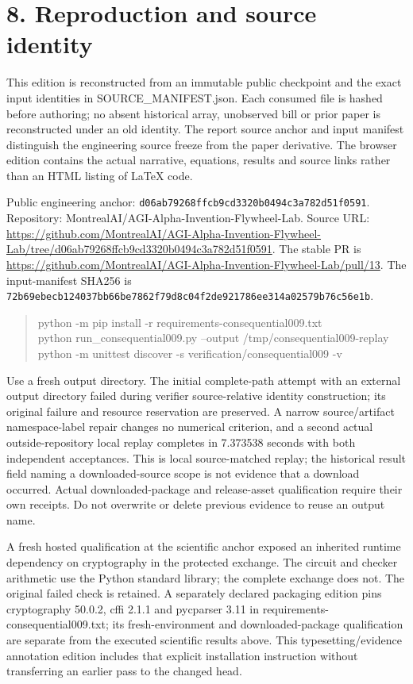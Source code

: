 \documentclass[10pt,letterpaper]{article}
\begin{document}
\section*{\color{accent}8. Reproduction and source identity}
This edition is reconstructed from an immutable public checkpoint and the exact input identities in SOURCE\_\allowbreak{}MANIFEST.json. Each consumed file is hashed before authoring; no absent historical array, unobserved bill or prior paper is reconstructed under an old identity. The report source anchor and input manifest distinguish the engineering source freeze from the paper derivative. The browser edition contains the actual narrative, equations, results and source links rather than an HTML listing of LaTeX code.\par
Public engineering anchor: \texttt{d06ab79268ff\allowbreak{}cb9cd3320b04\allowbreak{}94c3a782d51f\allowbreak{}0591}. Repository: MontrealAI/AGI-Alpha-Invention-Flywheel-Lab. Source URL: \url{https://github.com/MontrealAI/AGI-Alpha-Invention-Flywheel-Lab/tree/d06ab79268ffcb9cd3320b0494c3a782d51f0591}. The stable PR is \url{https://github.com/MontrealAI/AGI-Alpha-Invention-Flywheel-Lab/pull/13}. The input-manifest SHA256 is \texttt{72b69ebecb12\allowbreak{}4037bb66be78\allowbreak{}62f79d8c04f2\allowbreak{}de921786ee31\allowbreak{}4a02579b76c5\allowbreak{}6e1b}.\par
\begin{quote}\footnotesize\ttfamily\raggedright python -m pip install -r requirements-consequential009.txt\\python run\_\allowbreak{}consequential009.py --output /tmp/consequential009-replay\\python -m unittest discover -s verification/consequential009 -v\end{quote}
Use a fresh output directory. The initial complete-path attempt with an external output directory failed during verifier source-relative identity construction; its original failure and resource reservation are preserved. A narrow source/artifact namespace-label repair changes no numerical criterion, and a second actual outside-repository local replay completes in 7.373538 seconds with both independent acceptances. This is local source-matched replay; the historical result field naming a downloaded-source scope is not evidence that a download occurred. Actual downloaded-package and release-asset qualification require their own receipts. Do not overwrite or delete previous evidence to reuse an output name.\par
A fresh hosted qualification at the scientific anchor exposed an inherited runtime dependency on cryptography in the protected exchange. The circuit and checker arithmetic use the Python standard library; the complete exchange does not. The original failed check is retained. A separately declared packaging edition pins cryptography 50.0.2, cffi 2.1.1 and pycparser 3.11 in requirements-consequential009.txt; its fresh-environment and downloaded-package qualification are separate from the executed scientific results above. This typesetting/evidence annotation edition includes that explicit installation instruction without transferring an earlier pass to the changed head.\par
\end{document}
